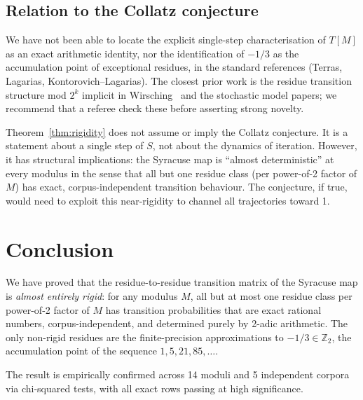 \documentclass[12pt,a4paper]{article}
\newcommand{\Ztwo}{\mathbb{Z}_2}
\begin{document}
\subsection{Relation to the Collatz conjecture}

We have not been able to locate the explicit single-step characterisation of
$T[M]$ as an exact arithmetic identity, nor the identification of $-1/3$ as the
accumulation point of exceptional residues, in the standard references (Terras,
Lagarias, Kontorovich--Lagarias).  The closest prior work is the residue
transition structure mod $2^k$ implicit in Wirsching~\cite{Wirsching1998} and
the stochastic model papers; we recommend that a referee check these before
asserting strong novelty.

Theorem~\ref{thm:rigidity} does not assume or imply the Collatz conjecture.
It is a statement about a single step of $S$, not about the dynamics of
iteration.  However, it has structural implications: the Syracuse map is
``almost deterministic'' at every modulus in the sense that all but one
residue class (per power-of-2 factor of $M$) has exact, corpus-independent
transition behaviour.  The conjecture, if true, would need to exploit this
near-rigidity to channel all trajectories toward 1.

\section{Conclusion}

We have proved that the residue-to-residue transition matrix of the Syracuse
map is \emph{almost entirely rigid}: for any modulus $M$, all but at most one
residue class per power-of-2 factor of $M$ has transition probabilities that
are exact rational numbers, corpus-independent, and determined purely by
2-adic arithmetic.  The only non-rigid residues are the finite-precision
approximations to $-1/3 \in \Ztwo$, the accumulation point of the sequence
$1, 5, 21, 85, \ldots$.

The result is empirically confirmed across 14 moduli and 5 independent corpora
via chi-squared tests, with all exact rows passing at high significance.
\end{document}
